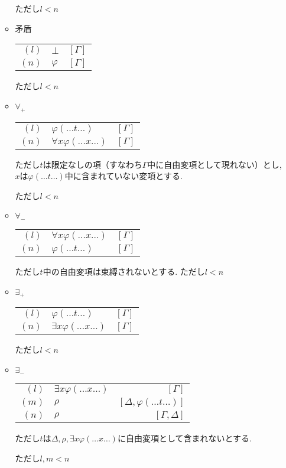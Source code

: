 \documentclass[10pt,b5paper,papersize,dvipdfmx]{jsbook}
\begin{document}
\begin{itemize}
\begin{itemize}
ただし$l<n$
\item 矛盾
\begin{table}[H]
\begin{center}
\begin{tabular}{rlr}
$(l)$&$\bot$&$[\Gamma]$ \\
$(n)$&$\varphi$&$[\Gamma]$
\end{tabular}
\end{center}
\end{table}
ただし$l<n$
\item $\forall_+$
\begin{table}[H]
\begin{center}
\begin{tabular}{rlr}
$(l)$&$\varphi(\dots t \dots)$&$[\Gamma]$ \\
$(n)$&$\forall x \varphi(\dots x \dots)$&$[\Gamma]$
\end{tabular}
\end{center}
\end{table}
ただし$t$は限定なしの項（すなわち$\Gamma$中に自由変項として現れない）とし,$x$は$\varphi(\dots t \dots)$中に含まれていない変項とする. \par
ただし$l<n$
\item $\forall_-$
\begin{table}[H]
\begin{center}
\begin{tabular}{rlr}
$(l)$&$\forall x\varphi(\dots x \dots)$&$[\Gamma]$ \\
$(n)$&$\varphi(\dots t \dots)$&$[\Gamma]$
\end{tabular}
\end{center}
\end{table}
ただし$t$中の自由変項は束縛されないとする.
ただし$l<n$
\item $\exists_+$
\begin{table}[H]
\begin{center}
\begin{tabular}{rlr}
$(l)$&$\varphi(\dots t \dots)$&$[\Gamma]$ \\
$(n)$&$\exists x\varphi(\dots x \dots)$&$[\Gamma]$
\end{tabular}
\end{center}
\end{table}
ただし$l<n$
\item $\exists_-$
\begin{table}[H]
\begin{center}
\begin{tabular}{rlr}
$(l)$&$\exists x\varphi(\dots x \dots)$&$[\Gamma]$ \\
$(m)$&$\rho$&$[\Delta,\varphi(\dots t \dots)]$ \\
$(n)$&$\rho$&$[\Gamma,\Delta]$
\end{tabular}
\end{center}
\end{table}
ただし$t$は$\Delta,\rho,\exists x\varphi(\dots x \dots)$に自由変項として含まれないとする. \par
ただし$l,m<n$
\end{itemize}
\end{itemize}
\end{document}
